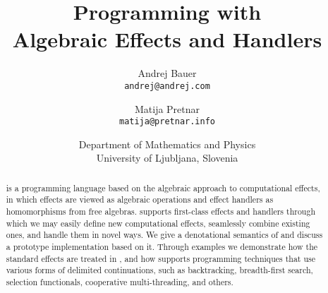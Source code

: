 \documentclass[10pt]{article}
\begin{document}
\title{Programming with \\ Algebraic Effects and Handlers}

\author{
Andrej Bauer\\\texttt{\small andrej@andrej.com}
\and
Matija Pretnar\\\texttt{\small matija@pretnar.info}
}
\date{\small Department of Mathematics and Physics\\
University of Ljubljana, Slovenia}

\maketitle


\begin{abstract}
  \Eff is a programming language based on the algebraic approach to computational effects,
  in which effects are viewed as algebraic operations and effect handlers as homomorphisms
  from free algebras. \Eff supports first-class effects and handlers through which we may
  easily define new computational effects, seamlessly combine existing ones, and handle
  them in novel ways. We give a denotational semantics of \eff and discuss a prototype
  implementation based on it. Through examples we demonstrate how the standard effects
  are treated in \eff, and how \eff supports programming techniques that use various forms
  of delimited continuations, such as backtracking, breadth-first search, selection
  functionals, cooperative multi-threading, and others.
\end{abstract}









%

\end{document}
